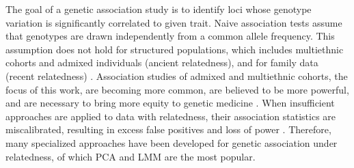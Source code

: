 \documentclass[9pt,lineno]{elife}
\begin{document}
The goal of a genetic association study is to identify loci whose genotype variation is significantly correlated to given trait.
Naive association tests assume that genotypes are drawn independently from a common allele frequency.
This assumption does not hold for structured populations, which includes multiethnic cohorts and admixed individuals (ancient relatedness), and for family data (recent relatedness) \citep{astle_population_2009}.
Association studies of admixed and multiethnic cohorts, the focus of this work, are becoming more common, are believed to be more powerful, and are necessary to bring more equity to genetic medicine \citep{rosenberg_genome-wide_2010, hoffman_correcting_2013, coram_genome-wide_2013, medina-gomez_challenges_2015, conomos_genetic_2016, hodonsky_genome-wide_2017, martin_human_2017, martin_unexpectedly_2017, hindorff_prioritizing_2018, hoffmann_large_2018, mogil_genetic_2018, roselli_multi-ethnic_2018, wojcik_genetic_2019, peterson_genome-wide_2019, zhong_using_2019, hu_minority-centric_2020, simonin-wilmer_overview_2021, kamariza_misuse_2021, lin_admixed_2021, mahajan_multi-ancestry_2022, hou_causal_2023}.
When insufficient approaches are applied to data with relatedness, their association statistics are miscalibrated, resulting in excess false positives and loss of power \citep{devlin_genomic_1999, voight_confounding_2005, astle_population_2009}.
Therefore, many specialized approaches have been developed for genetic association under relatedness, of which PCA and LMM are the most popular.
\end{document}
